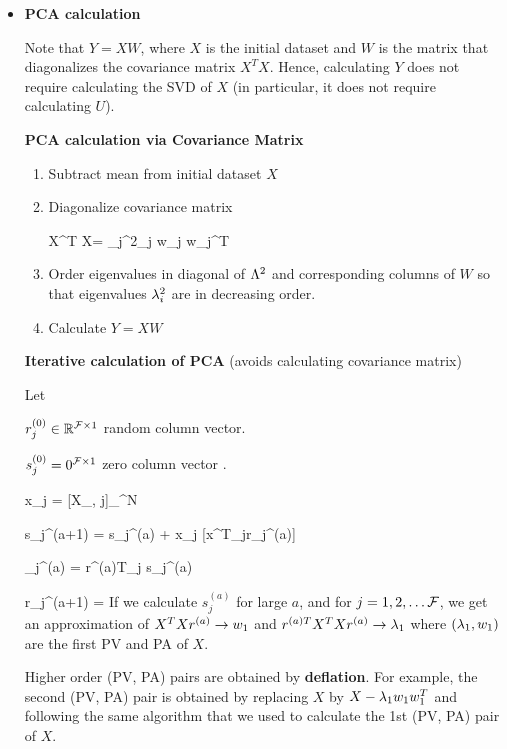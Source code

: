 \begin{itemize}
\item {\bf PCA calculation}

Note that $Y=XW$, where $X$ is the initial dataset and $W$ is the matrix that diagonalizes the covariance matrix $X^T X$. Hence, calculating $Y$
does not require calculating the SVD of $X$ (in particular, it does not require calculating $U$). 

{\bf PCA calculation via Covariance Matrix}
\begin{enumerate}
\item Subtract mean from initial dataset $X$
\item Diagonalize covariance matrix 

\beq
X^T X=
\sum_j\lam^2_j w_j w_j^T
\eeq
\item Order eigenvalues in diagonal of $\Lambda^2$ and corresponding columns of $W$ so that eigenvalues $\lambda^2_i$ are in decreasing order.
\item Calculate $Y= XW$
\end{enumerate}

{\bf Iterative calculation of PCA}
(avoids calculating covariance matrix)

Let 

$r^{(0)}_j\in { \mathbb{R}}^{{\cal F} \times 1}$ random column vector. 

$s^{(0)}_j=0^{{\cal F} \times 1}$ zero column vector .


\beq
x_j = [X_{\s, j}]_{}^N
\;\; 
\eeq

\beq
s_{j}^{(a+1)} = s_j^{(a)} + x_j  [x^T_jr_j^{(a)}] 
\eeq


\beq
\lam_j^{(a)} = r^{(a)T}_j s_j^{(a)}
\eeq

\beq
r_{j}^{(a+1)} =
\eeq
If we calculate $s_j^{(a)}$ for large $a$, and for $j=1, 2, \ldots {\cal F}$, we get an approximation of
$X^T X r^{(a)}\rightarrow w_1$ and 
$r^{(a)T}X^T X r^{(a)}\rightarrow \lambda_1$ where
$(\lambda_1, w_1)$ are the first PV and PA of $X$.

Higher order (PV, PA) pairs are obtained by {\bf deflation}. 
For example, the second (PV, PA) pair is obtained by 
replacing $X$ by $X -\lambda_1 w_1 w_1^T$ and following the same algorithm that we used to
calculate the 1st (PV, PA) pair of $X$.


\end{itemize}
